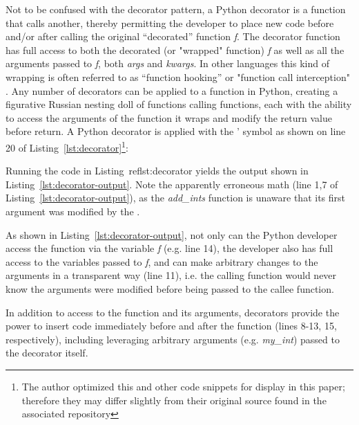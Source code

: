 Not to be confused with the decorator pattern, a Python decorator is a 
function that calls another, thereby permitting the developer to place new code 
before and/or after calling the original “decorated” function \textit{f}.  
The decorator function has full access to both the decorated 
(or "wrapped" function) \textit{f} as well as all the 
arguments passed to \textit{f}, both \textit{args} and \textit{kwargs}.  In other 
languages this kind of wrapping is often referred to as 
“function hooking” or "function call interception" 
 \cite{kang2018function}. Any number of decorators can be applied to a function 
in Python, creating a figurative Russian nesting doll of
functions calling functions, each with the ability to access the 
arguments of the function it wraps and modify the 
return value before return. A Python decorator is applied with the \lq@\rq 
symbol as shown on line 20 of Listing~\ref{lst:decorator}\footnote{The author optimized this and other code snippets for display in 
this paper; therefore they may differ slightly from their original 
source found in the associated repository}:



Running the code in Listing~ref{lst:decorator} yields the output shown in 
Listing~\ref{lst:decorator-output}. Note the apparently erroneous math (line 1,7 of 
Listing~\ref{lst:decorator-output}), as the \textit{add\_ints} function is 
unaware that its first argument was modified by the .



As shown in Listing~\ref{lst:decorator-output}, not only can the Python developer access the function
via the variable \textit{f} (e.g. line 14), the developer also has full
access to the variables passed to \textit{f}, and can make 
arbitrary changes to the arguments in a transparent way (line 11), 
i.e. the calling function would never know the arguments 
were modified before being passed to the callee function.

In addition to access to the function and its arguments,
decorators provide the power to insert code immediately before and after 
the function (lines 8-13, 15, respectively), including leveraging arbitrary
arguments (e.g. \textit{my\_int}) passed to the decorator itself.

